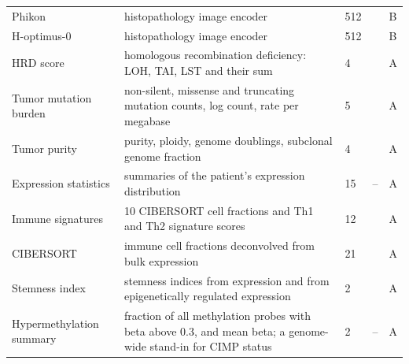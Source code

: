 {\begin{longtable}{P{3.0cm}P{5.0cm}P{1.5cm}P{1.5cm}P{1.4cm}}
Phikon & histopathology image encoder & 512 & \citep{Filiot2023} & B \\
H-optimus-0 & histopathology image encoder & 512 & \citep{Saillard2024} & B \\
HRD score & homologous recombination deficiency: LOH, TAI, LST and their sum & 4 & \citep{Knijnenburg2018} & A \\
Tumor mutation burden & non-silent, missense and truncating mutation counts, log count, rate per megabase & 5 & \citep{Ellrott2018} & A \\
Tumor purity & purity, ploidy, genome doublings, subclonal genome fraction & 4 & \citep{Carter2012} & A \\
Expression statistics & summaries of the patient's expression distribution & 15 & -- & A \\
Immune signatures & 10 CIBERSORT cell fractions and Th1 and Th2 signature scores & 12 & \citep{Thorsson2018} & A \\
CIBERSORT & immune cell fractions deconvolved from bulk expression & 21 & \citep{Newman2015, Thorsson2018} & A \\
Stemness index & stemness indices from expression and from epigenetically regulated expression & 2 & \citep{Malta2018} & A \\
Hypermethylation summary & fraction of all methylation probes with beta above 0.3, and mean beta; a genome-wide stand-in for CIMP status \citep{Toyota1999} & 2 & -- & A \\
\end{longtable}}

